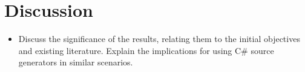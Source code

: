 \chapter{Discussion}
\begin{itemize}
    \item Discuss the significance of the results, relating them to the initial objectives and existing literature. Explain the implications for using C\# source generators in similar scenarios.
\end{itemize}